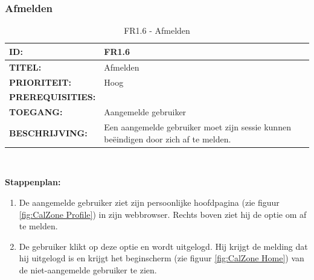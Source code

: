 
\subsubsection{Afmelden}
\noindent\begin{table}[H]
            \begin{tabular}{l | p{10cm}}
                \textbf{ID:} & FR1.6 \\ \hline
                \textbf{TITEL:} & Afmelden\\ \hline
                \textbf{PRIORITEIT:} &  Hoog \\ \hline
                \textbf{PREREQUISITIES:} & \\ \hline
                \textbf{TOEGANG:} &  Aangemelde gebruiker \\ \hline
                \textbf{BESCHRIJVING:} & Een aangemelde gebruiker moet zijn sessie kunnen be\"{e}indigen door zich af te melden.\\
            \end{tabular}\\
            \caption{FR1.6 - Afmelden}
            \label{tab:FR1.6 - Afmelden}
        \end{table}
\textbf{Stappenplan:}
\begin{enumerate}
\item De aangemelde gebruiker ziet zijn persoonlijke hoofdpagina (zie figuur \ref{fig:CalZone Profile}) in zijn webbrowser. Rechts boven ziet hij de optie om af te melden.
\item De gebruiker klikt op deze optie en wordt uitgelogd. Hij krijgt de melding dat hij uitgelogd is en krijgt het beginscherm (zie figuur \ref{fig:CalZone Home}) van de niet-aangemelde gebruiker te zien.
\end{enumerate} 

